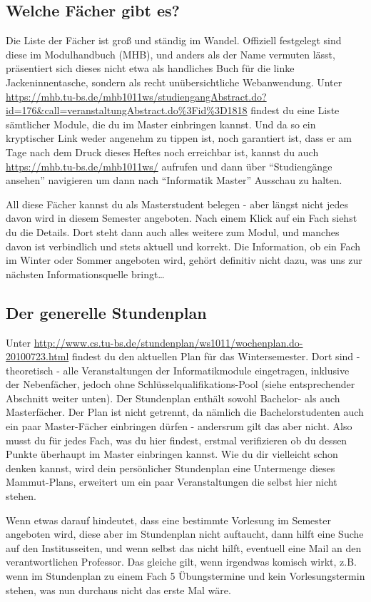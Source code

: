 \subsection{Welche Fächer gibt es?}
Die Liste der Fächer ist groß und ständig im Wandel. Offiziell festgelegt sind diese im Modulhandbuch (MHB), und anders als der Name vermuten lässt, präsentiert sich dieses nicht etwa als handliches Buch für die linke Jackeninnentasche, sondern als recht unübersichtliche Webanwendung. Unter \url{https://mhb.tu-bs.de/mhb1011ws/studiengangAbstract.do?id=176&call=veranstaltungAbstract.do%3Fid%3D1818} findest du eine Liste sämtlicher Module, die du im Master einbringen kannst. Und da so ein kryptischer Link weder angenehm zu tippen ist, noch garantiert ist, dass er am Tage nach dem Druck dieses Heftes noch erreichbar ist, kannst du auch \url{https://mhb.tu-bs.de/mhb1011ws/} aufrufen und dann über "`Studiengänge ansehen"' navigieren um dann nach "`Informatik Master"' Ausschau zu halten.

All diese Fächer kannst du als Masterstudent belegen - aber längst nicht jedes davon wird in diesem Semester angeboten. Nach einem Klick auf ein Fach siehst du die Details. Dort steht dann auch alles weitere zum Modul, und manches davon ist verbindlich und stets aktuell und korrekt. Die Information, ob ein Fach im Winter oder Sommer angeboten wird, gehört definitiv nicht dazu, was uns zur nächsten Informationsquelle bringt\ldots

\subsection{Der generelle Stundenplan}
Unter \url{http://www.cs.tu-bs.de/stundenplan/ws1011/wochenplan.do-20100723.html} findest du den aktuellen Plan für das Wintersemester. Dort sind - theoretisch - alle Veranstaltungen der Informatikmodule eingetragen, inklusive der Nebenfächer, jedoch ohne Schlüsselqualifikations-Pool (siehe entsprechender Abschnitt weiter unten). Der Stundenplan enthält sowohl Bachelor- als auch Masterfächer. Der Plan ist nicht getrennt, da nämlich die Bachelorstudenten auch ein paar Master-Fächer einbringen dürfen - andersrum gilt das aber nicht. Also musst du für jedes Fach, was du hier findest, erstmal verifizieren ob du dessen Punkte überhaupt im Master einbringen kannst. Wie du dir vielleicht schon denken kannst, wird dein persönlicher Stundenplan eine Untermenge dieses Mammut-Plans, erweitert um ein paar Veranstaltungen die selbst hier nicht stehen.

Wenn etwas darauf hindeutet, dass eine bestimmte Vorlesung im Semester angeboten wird, diese aber im Stundenplan nicht auftaucht, dann hilft eine Suche auf den Institusseiten, und wenn selbst das nicht hilft, eventuell eine Mail an den verantwortlichen Professor. Das gleiche gilt, wenn irgendwas komisch wirkt, z.B. wenn im Stundenplan zu einem Fach 5 Übungstermine und kein Vorlesungstermin stehen, was nun durchaus nicht das erste Mal wäre.

